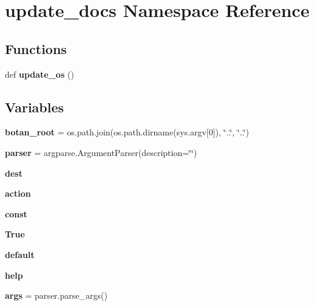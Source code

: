 \hypertarget{namespaceupdate__docs}{}\section{update\+\_\+docs Namespace Reference}
\label{namespaceupdate__docs}
\subsection*{Functions}
\begin{DoxyCompactItemize}
\item 
\mbox{\label{namespaceupdate__docs_a7e4a04606f2d7f477e7118c0675cd81c}} 
def {\bfseries update\+\_\+os} ()
\end{DoxyCompactItemize}
\subsection*{Variables}
\begin{DoxyCompactItemize}
\item 
\mbox{\label{namespaceupdate__docs_a792c70aaaeb273d9d58b11be2b74a3f5}} 
{\bfseries botan\+\_\+root} = os.\+path.\+join(os.\+path.\+dirname(sys.\+argv\mbox{[}0\mbox{]}), \char`\"{}..\char`\"{}, \char`\"{}..\char`\"{})
\item 
\mbox{\label{namespaceupdate__docs_aea7e2bed065aa99fd1ab73b9f2df5525}} 
{\bfseries parser} = argparse.\+Argument\+Parser(description=\char`\"{}\char`\"{})
\item 
\mbox{\label{namespaceupdate__docs_ae1eee51b54ce35a5027dc40ab8270588}} 
{\bfseries dest}
\item 
\mbox{\label{namespaceupdate__docs_ad91b98ebcac967f143a86c7bdf4b3195}} 
{\bfseries action}
\item 
\mbox{\label{namespaceupdate__docs_a56b4b09a78b426088bb37a91c00205cb}} 
{\bfseries const}
\item 
\mbox{\label{namespaceupdate__docs_ac1cffb1c527e84929bb14646c7887cc5}} 
{\bfseries True}
\item 
\mbox{\label{namespaceupdate__docs_a8f784bc570933591245bb74663750434}} 
{\bfseries default}
\item 
\mbox{\label{namespaceupdate__docs_af8db76827683857933dd67fd82944f11}} 
{\bfseries help}
\item 
\mbox{\label{namespaceupdate__docs_a931b8ce0ef7f31ae31b867b1034841fc}} 
{\bfseries args} = parser.\+parse\+\_\+args()
\end{DoxyCompactItemize}


